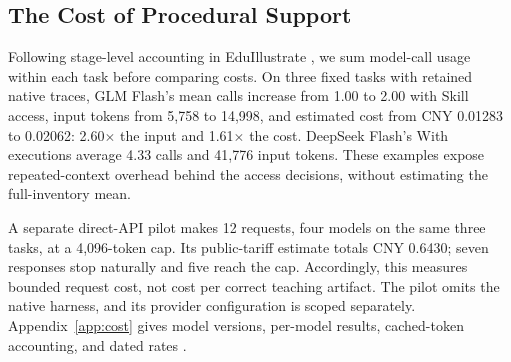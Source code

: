 \subsection{The Cost of Procedural Support}
\label{sec:cost}

Following stage-level accounting in EduIllustrate \citep{eduillustrate}, we
sum model-call usage within each task before comparing costs. On three fixed
tasks with retained native traces, GLM Flash's mean calls increase from
1.00 to 2.00 with Skill access, input tokens from 5,758 to 14,998, and
estimated cost from CNY 0.01283 to 0.02062: 2.60$\times$ the input and
1.61$\times$ the cost. DeepSeek Flash's With executions average 4.33 calls
and 41,776 input tokens. These examples expose repeated-context overhead
behind the access decisions, without estimating the full-inventory mean.

A separate direct-API pilot makes 12 requests, four models on the same
three tasks, at a 4,096-token cap. Its public-tariff estimate totals CNY
0.6430; seven responses stop naturally and five reach the cap. Accordingly,
this measures bounded request cost, not cost per correct teaching artifact.
The pilot omits the native harness, and its provider configuration is scoped
separately. Appendix~\ref{app:cost} gives model versions, per-model results,
cached-token accounting, and dated rates \citep{arkpricing}.
